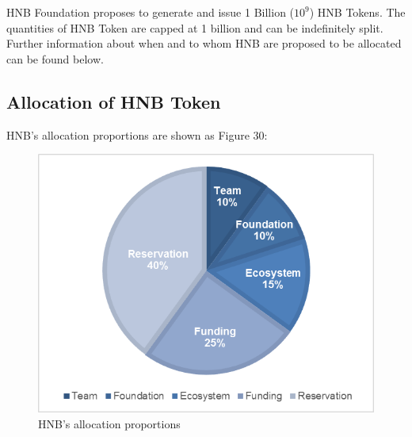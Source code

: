 \documentclass[fleqn,10pt]{SelfArx} %
\begin{document}
HNB Foundation proposes to generate and issue 1 Billion ($10^9$) HNB Tokens. The quantities of HNB Token are capped at 1 billion and can be indefinitely split. Further information about when and to whom HNB are proposed to be allocated can be found below.

\subsection{Allocation of HNB Token}
HNB's allocation proportions are shown as Figure 30:

\begin{figure}[ht]\centering
\includegraphics[width=\linewidth]{37}
\caption{HNB's allocation proportions}
\label{fig:37}
\end{figure}
\end{document}

